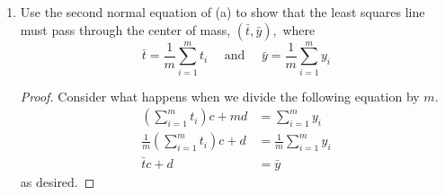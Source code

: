 \documentclass[11pt]{scrartcl}
\begin{document}
\begin{enumerate}[label=\alph*.]
{\begin{proof}
\begin{align*}
\begin{bmatrix}
				      y_2    \\
				      \vdots \\
				      y_m
			      \end{bmatrix}
		      \end{align*}
		      $$\left(\sum_{i=1}^{m} t_{i}^{2}\right) c+\left(\sum_{i=1}^{m} t_{i}\right) d=\sum_{i=1}^{m} t_{i} y_{i}$$
		      and
		      $$\left(\sum_{i=1}^{m} t_{i}\right) c+m d=\sum_{i=1}^{m} y_{i}$$
		      as desired.
	      \end{proof}
	      }
	\item{
	      Use the second normal equation of (a) to show that the least squares line must pass through the center of mass,
	      $(\bar{t}, \bar{y}),$ where
	      $$\bar{t}=\frac{1}{m} \sum_{i=1}^{m} t_{i} \quad \text { and } \quad \bar{y}=\frac{1}{m} \sum_{i=1}^{m} y_{i}$$
	      \begin{proof}
		      Consider what happens when we divide the following equation by $m$.
		      \begin{align*}
			      \left(\sum_{i=1}^{m} t_{i}\right) c+m d          & =\sum_{i=1}^{m} y_{i}             \\
			      \frac{1}{m}\left(\sum_{i=1}^{m} t_{i}\right) c+d & =\frac{1}{m} \sum_{i=1}^{m} y_{i} \\
			      \bar{t}c+d                                       & = \bar{y}
		      \end{align*}
		      as desired.
	      \end{proof}
	      }
\end{enumerate}


\end{document}
